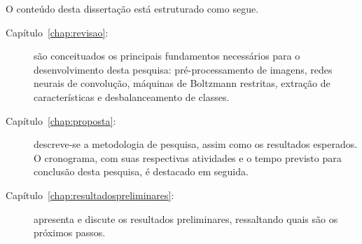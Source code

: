 O conteúdo desta dissertação está estruturado como segue.

\begin{description}
\item [Capítulo~\ref{chap:revisao}:] são conceituados os principais fundamentos necessários para o desenvolvimento desta pesquisa: pré-processamento de imagens, redes neurais de convolução, máquinas de Boltzmann restritas, extração de características e desbalanceamento de classes.

\item [Capítulo~\ref{chap:proposta}:] descreve-se a metodologia de pesquisa, assim como os resultados esperados. O cronograma, com suas respectivas atividades e o tempo previsto para conclusão desta pesquisa, é destacado em seguida.

\item [Capítulo~\ref{chap:resultadospreliminares}:] apresenta e discute os resultados preliminares, ressaltando quais são os próximos passos.
\end{description}



